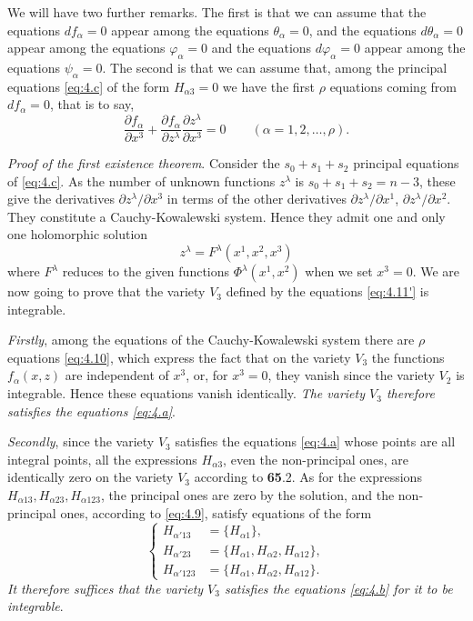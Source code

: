\documentclass[leqno,11pt]{book}
\numberwithin{equation}{chapter}
\newcommand{\pd}{\partial}
\theoremstyle{shape1}
\theoremstyle{shape0}
\theoremstyle{shape2}
\theoremstyle{definition}
\begin{document}
We will have two further remarks. The first is that we can assume that the equations $df_{\alpha}=0$ appear among the equations $\theta_{\alpha}=0$, and the equations $d\theta_{\alpha}=0$ appear among the equations $\varphi_{\alpha}=0$ and the equations $d\varphi_{\alpha}=0$ appear among the equations $\psi_{\alpha}=0$. The second is that we can assume that, among the principal equations \eqref{eq:4.c} of the form $H_{\alpha 3}=0$ we have the first $\rho$  equations coming from $df_{\alpha}=0$, that is to say,
\begin{equation}
  \label{eq:4.10}
  \frac{\pd f_{\alpha}}{\pd x^{3}}+\frac{\pd f_{\alpha}}{\pd z^{\lambda}}\frac{\pd z^{\lambda}}{\pd x^{3}}=0\qquad (\alpha=1,2,\dots,\rho).
\end{equation}


\vspace{12pt}\fsec \emph{Proof of the first existence theorem}. Consider the $s_{0}+s_{1}+s_{2}$ principal equations of \eqref{eq:4.c}. As the number of unknown functions $z^{\lambda}$ is $s_{0}+s_{1}+s_{2}=n-3$, these give the derivatives $\pd z^{\lambda}/\pd x^{3}$ in terms of the other derivatives $\pd z^{\lambda}/\pd x^{1}$, $\pd z^{\lambda}/\pd x^{2}$. They constitute a Cauchy-Kowalewski system. Hence they admit one and only one holomorphic solution
\begin{equation}
  \label{eq:4.11'}
  z^{\lambda}=F^{\lambda}(x^{1},x^{2},x^{3})
\end{equation}
where $F^{\lambda}$ reduces to the given functions $\Phi^{\lambda}(x^{1},x^{2})$ when we set $x^{3}=0$. We are now going to prove that the variety $V_{3}$ defined by the equations \eqref{eq:4.11'} is integrable.

\emph{Firstly}, among the equations of the Cauchy-Kowalewski system there are $\rho$ equations \eqref{eq:4.10}, which express the fact that on the variety $V_{3}$ the functions $f_{\alpha}(x,z)$ are independent of $x^{3}$, or, for $x^{3}=0$, they vanish since the variety $V_{2}$ is integrable. Hence these equations vanish identically. \emph{The variety $V_{3}$ therefore satisfies the equations \eqref{eq:4.a}}.

\emph{Secondly}, since the variety $V_{3}$ satisfies the equations \eqref{eq:4.a} whose points are all integral points, all the expressions $H_{\alpha 3}$, even the non-principal ones, are identically zero on the variety $V_{3}$ according to \textsection\textbf{65}.2. As for the expressions $H_{\alpha 13}, H_{\alpha 23}, H_{\alpha 123}$, the principal ones are zero by the solution, and the non-principal ones, according to \eqref{eq:4.9}, satisfy equations of the form
\begin{equation}
  \label{eq:4.11}
  \left\{
    \begin{aligned}
      H_{\alpha'13}&=\{H_{\alpha 1}\},\\
      H_{\alpha'23}&=\{H_{\alpha 1},H_{\alpha 2},H_{\alpha 12}\},\\
      H_{\alpha'123}&=\{H_{\alpha 1},H_{\alpha 2},H_{\alpha 12}\}.
    \end{aligned}
  \right.
\end{equation}
\emph{It therefore suffices that the variety $V_{3}$ satisfies the equations \eqref{eq:4.b} for it to be integrable}.
\end{document}
